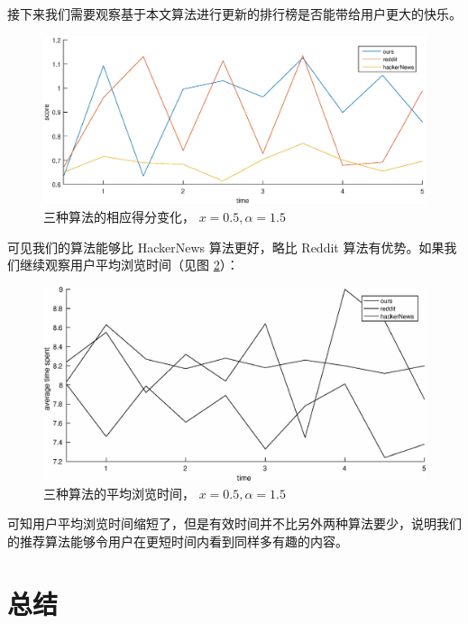 \documentclass[UTF8]{ctexart}
\theoremstyle{plain}
\theoremstyle{definition}
\theoremstyle{remark}
\begin{document}
	接下来我们需要观察基于本文算法进行更新的排行榜是否能带给用户更大的快乐。
	\begin{figure}[h!]
		\centering
		\includegraphics[width = \linewidth]{../model/douhu/pic/three-method-score.eps}
		\caption{三种算法的相应得分变化， $x=0.5, \alpha=1.5$}\label{fig:three-method-score}
	\end{figure}
	可见我们的算法能够比 HackerNews 算法更好，略比 Reddit 算法有优势。如果我们继续观察用户平均浏览时间（见图 \ref{fig:three-method-average-time}）：
	\begin{figure}[h!]
		\centering
		\includegraphics[width = \linewidth]{../model/douhu/pic/three-method-average-time.eps}
		\caption{三种算法的平均浏览时间， $x=0.5, \alpha=1.5$}\label{fig:three-method-average-time}
	\end{figure}
	可知用户平均浏览时间缩短了，但是有效时间并不比另外两种算法要少，说明我们的推荐算法能够令用户在更短时间内看到同样多有趣的内容。

	\section{总结}
	
	
	
	
	\newpage
	\appendix
\end{document}
